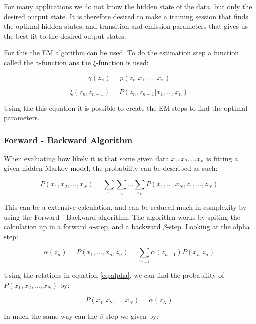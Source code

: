 For many applications we do not know the hidden state of the data, but only the desired output state. It is therefore desired to make a training session that finds the optimal hidden states, and transition and emission parameters that gives us the best fit to the desired output states. 

For this the EM algorithm can be used. To do the estimation step a function called the $\gamma$-function ans the $\xi$-function is used: 

\begin{equation}
	\gamma(z_n) = p(z_n| x_1, ..., x_n)
\end{equation}

\begin{equation}
	\xi(z_n, z_{n-1}) = P(z_n, z_{n-1}| x_1, ..., x_n)
\end{equation}

Using the this equation it is possible to create the EM steps to find the optimal parameters. 

\subsubsection{Forward - Backward Algorithm }
When evaluating how likely it is that some given data $x_1, x_2, ... x_n$ is fitting a given hidden Markov model, the probability can be described as such: 

\begin{equation}
	P(x_1, x_2,..., x_N) = \sum\limits_{z_1}\sum\limits_{z_2} ... \sum\limits_{z_M} P(x_1, ..., x_N, z_1, ..., z_N)
\end{equation}

This can be a extensive calculation, and can be reduced much in complexity by using the Forward - Backward algorithm. The algorithm works by spiting the calculation up in a forward $\alpha$-step, and a backward $\beta$-step. Looking at the alpha step:

\begin{equation}
	\alpha(z_n) = P(x_1, ..., x_n, z_n) = \sum\limits_{z_{n-1}} \alpha(z_{n-1}) P(x_n|z_n)
	\label{eq:alpha}
\end{equation}

Using the relations in equation \ref{eq:alpha}, we can find the probability of $P(x_1, x_2,..., x_N)$ by: 

\begin{equation}
	P(x_1, x_2,..., x_N) = \alpha(z_N)
\end{equation}

In much the same way can the $\beta$-step we given by: 

